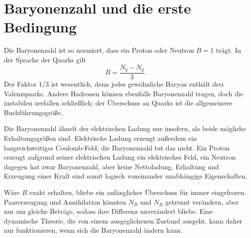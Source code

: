 \section{Baryonenzahl und die erste Bedingung}

Die Baryonenzahl ist so normiert, dass ein Proton oder Neutron \(B=1\) trägt. In der Sprache der Quarks gilt
\begin{equation}
B=\frac{N_q-N_{\bar q}}{3}.
\label{eq:c08-baryon-number}
\end{equation}
Der Faktor \(1/3\) ist wesentlich, denn jedes gewöhnliche Baryon enthält drei Valenzquarks. Andere Hadronen können ebenfalls Baryonenzahl tragen, doch die instabilen zerfallen schließlich; der Überschuss an Quarks ist die allgemeinere Buchführungsgröße.

\begin{classroomqa}\end{classroomqa}

Die Baryonenzahl ähnelt der elektrischen Ladung nur insofern, als beide mögliche Erhaltungsgrößen sind. Elektrische Ladung erzeugt außerdem ein langreichweitiges Coulomb-Feld; die Baryonenzahl tut das nicht. Ein Proton erzeugt aufgrund seiner elektrischen Ladung ein elektrisches Feld, ein Neutron dagegen hat zwar Baryonenzahl, aber keine Nettoladung. Erhaltung und Erzeugung einer Kraft sind somit logisch voneinander unabhängige Eigenschaften.

\begin{classroomqa}\end{classroomqa}

Wäre \(B\) exakt erhalten, bliebe ein anfänglicher Überschuss für immer eingefroren. Paarerzeugung und Annihilation könnten \(N_B\) und \(N_{\bar B}\) getrennt verändern, aber nur um gleiche Beträge, sodass ihre Differenz unverändert bliebe. Eine dynamische Theorie, die von einem ausgeglichenen Zustand ausgeht, kann daher nur funktionieren, wenn sich die Baryonenzahl ändern kann.

